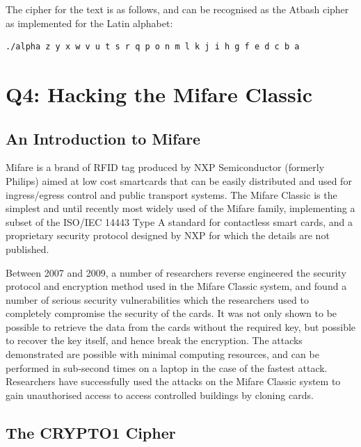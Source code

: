 \documentclass[pdflatex, a4paper,12pt]{article}
\begin{document}
\begin{quote}
    
\end{quote}    

The cipher for the text is as follows, and can be recognised as the Atbash
cipher as implemented for the Latin alphabet:

\begin{verbatim}
./alpha z y x w v u t s r q p o n m l k j i h g f e d c b a
\end{verbatim}

\section{Q4: Hacking the Mifare Classic}

\subsection{An Introduction to Mifare}

Mifare is a brand of RFID tag produced by NXP Semiconductor (formerly Philips)
aimed at low cost smartcards that can be easily distributed and used for
ingress/egress control and public transport systems. The Mifare Classic is the
simplest and until recently most widely used of the Mifare
family\cite{mayes_transport_2009},
implementing a subset of the ISO/IEC 14443 Type A standard for contactless smart
cards, and a proprietary security protocol designed by NXP for which the details
are not published.

Between 2007 and 2009, a number of researchers reverse engineered the security
protocol and encryption method used in the Mifare Classic system, and found a
number of serious security vulnerabilities which the researchers used to
completely compromise the security of the cards. It was not only shown to be
possible to retrieve the data from the cards without the required key, but
possible to recover the key itself, and hence break the encryption. The attacks
demonstrated are possible with minimal computing resources, and can be performed
in sub-second times on a laptop in the case of the fastest attack. Researchers
have successfully used the attacks on the Mifare Classic system to gain unauthorised
access to access controlled buildings by cloning
cards\cite{digitalsecurityrun_mifare_2008}.

\subsection{The CRYPTO1 Cipher}
\end{document}
